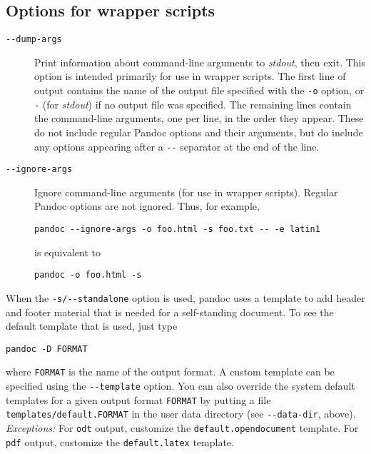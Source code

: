 \documentclass[]{article}
\begin{document}
\subsection{Options for wrapper scripts}

\begin{description}
\item[\texttt{-{}-dump-args}]
Print information about command-line arguments to \emph{stdout}, then
exit. This option is intended primarily for use in wrapper scripts. The
first line of output contains the name of the output file specified with
the \texttt{-o} option, or \texttt{-} (for \emph{stdout}) if no output
file was specified. The remaining lines contain the command-line
arguments, one per line, in the order they appear. These do not include
regular Pandoc options and their arguments, but do include any options
appearing after a \texttt{-{}-} separator at the end of the line.
\item[\texttt{-{}-ignore-args}]
Ignore command-line arguments (for use in wrapper scripts). Regular
Pandoc options are not ignored. Thus, for example,

\begin{verbatim}
pandoc --ignore-args -o foo.html -s foo.txt -- -e latin1
\end{verbatim}

is equivalent to

\begin{verbatim}
pandoc -o foo.html -s
\end{verbatim}
\end{description}


When the \texttt{-s/-{}-standalone} option is used, pandoc uses a
template to add header and footer material that is needed for a
self-standing document. To see the default template that is used, just
type

\begin{verbatim}
pandoc -D FORMAT
\end{verbatim}

where \texttt{FORMAT} is the name of the output format. A custom
template can be specified using the \texttt{-{}-template} option. You
can also override the system default templates for a given output format
\texttt{FORMAT} by putting a file \texttt{templates/default.FORMAT} in
the user data directory (see \texttt{-{}-data-dir}, above).
\emph{Exceptions:} For \texttt{odt} output, customize the
\texttt{default.opendocument} template. For \texttt{pdf} output,
customize the \texttt{default.latex} template.
\end{document}
